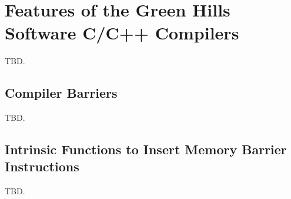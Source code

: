 \section{Features of the Green Hills Software\textsuperscript{\textregistered}
         C/C++ Compilers}
\label{sghc0}

TBD.


\subsection{Compiler Barriers}
\label{sghc0:scba0}

TBD.


\subsection{Intrinsic Functions to Insert Memory Barrier Instructions}
\label{sghc0:sifu0}

TBD.
